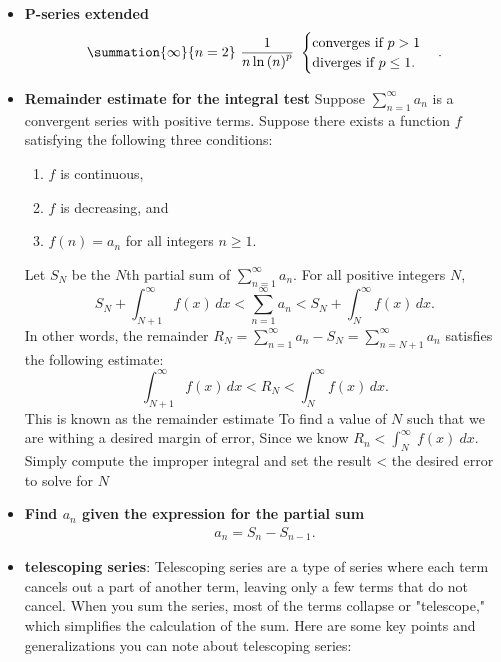 \documentclass{report}
\begin{document}
\begin{itemize}
    \item \textbf{P-series extended}
        \begin{align*}
            \summation{\infty}{n=2}\ \frac{1}{n\ln{(n)}^{p}}\ 
            \begin{cases}
        \text{converges if } p>1 \\
        \text{diverges if } p \leq 1.
        \end{cases}
        .\end{align*}
    \item \textbf{Remainder estimate for the integral test}
                Suppose \( \sum_{n=1}^{\infty} a_n \)
        is a convergent series with positive terms. Suppose there exists a function \( f \)
        satisfying the following three conditions:
        \begin{enumerate}
            \item \( f \) is continuous,
            \item \( f \) is decreasing, and
            \item \( f(n) = a_n \) for all integers \( n \geq 1 \).
        \end{enumerate}
        Let \( S_N \) be the \( N \)th partial sum of \( \sum_{n=1}^{\infty} a_n \).
        For all positive integers \( N \),
        \[
        S_N + \int_{N+1}^{\infty} f(x) \, dx < \sum_{n=1}^{\infty} a_n < S_N + \int_{N}^{\infty} f(x) \, dx.
        \]
        In other words, the remainder \( R_N = \sum_{n=1}^{\infty} a_n - S_N = \sum_{n=N+1}^{\infty} a_n \)
        satisfies the following estimate:
        \[
        \int_{N+1}^{\infty} f(x) \, dx < R_N < \int_{N}^{\infty} f(x) \, dx.
        \]
        This is known as the remainder estimate 
        \bigbreak \noindent 
        To find a value of $N$ such that we are withing a desired margin of error, Since we know $R_{n} < \int_{N}^{\infty}\ f(x)\ dx $. Simply compute the improper integral and set the result < the desired error to solve for $N$
    \item \textbf{Find $a_{n}$ given the expression for the partial sum}
        \begin{align*}
            a_{n} = S_{n} - S_{n-1}
        .\end{align*}
    \pagebreak 
    \item \textbf{telescoping series}: Telescoping series are a type of series where each term cancels out a part of another term, leaving only a few terms that do not cancel. When you sum the series, most of the terms collapse or "telescope," which simplifies the calculation of the sum. Here are some key points and generalizations you can note about telescoping series:

\end{itemize}
\end{document}
